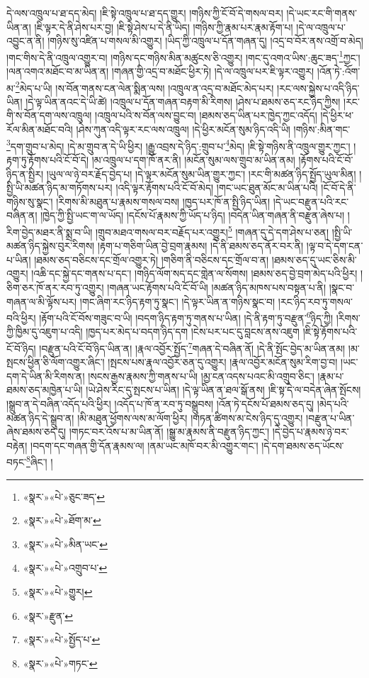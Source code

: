 དེ་ལས་འཁྲུལ་པ་ཐ་དད་མེད། །ཇི་སྟེ་འཁྲུལ་པ་ཐ་དད་གྱུར། །གཉིས་ཀྱི་ངོ་བོ་དེ་གསལ་བར། །དེ་ཡང་རང་གི་གནས་ཡིན་ན། །ཇི་ལྟར་དེ་ནི་ཤེས་པར་བྱ། །ཇི་སྟེ་ཤེས་པ་དེ་ནི་ཡིད། །གཉིས་ཀྱི་རྣམ་པར་རྣམ་རྟོག་པ། །དེ་ལ་འཁྲུལ་པ་འབྱུང་ན་ནི། །གཉིས་སུ་འཛིན་པ་གསལ་མི་འགྱུར། །ཡིད་ཀྱི་འཁྲུལ་པ་དོན་གཞན་དུ། །འདྲ་བ་བོར་ནས་འགྲོ་བ་མེད། །གང་གིས་དེ་ནི་འཁྲུལ་འགྱུར་བ། །གཉིས་དང་གཉིས་མིན་མཚུངས་ཅི་འགྱུར། །གང་དུ་འགའ་ཡིས་:ཆུང་ཟད་\footnote{«སྣར་»«པེ་»ཅུང་ཟད་}ཀྱང་། །ལན་འགའ་མཐོང་བ་མ་ཡིན་ན། །གཞན་གྱི་འདྲ་བ་མཐོང་ཕྱིར་ཏེ། །དེ་ལ་འཁྲུལ་པར་ཇི་ལྟར་འགྱུར། །འོན་ཏེ་:འོག་མ་\footnote{«སྣར་»«པེ་»ཐོག་མ་}མེད་པ་ཡི། །ས་བོན་གནས་ངན་ལེན་སྨིན་ལས། །འཁྲུལ་ན་འདྲ་བ་མཐོང་མེད་པར། །རང་ལས་སྐྱེས་པ་འདི་ཉིད་ཡིན། །དེ་ལྟ་ཡིན་ནའང་དེ་ཡི་ཚེ། །འཁྲུལ་པ་དོན་གཞན་བརྟག་མི་རིགས། །ཤེས་པ་ཐམས་ཅད་རང་ཉིད་ཀྱིས། །རང་གི་ས་བོན་དག་ལས་འཁྲུལ། །འཁྲུལ་པའི་ས་བོན་ལས་བྱུང་བ། །ཐམས་ཅད་ཡིན་པར་ཁྱེད་ཀྱང་འདོད། །དེ་ཕྱིར་ཕ་རོལ་མིན་མཐོང་བའི། །ཤེས་ཀུན་འདི་ལྟར་རང་ལས་འཁྲུལ། །དེ་ཕྱིར་མངོན་སུམ་ཉིད་འདི་ཡི། །གཉིས་:མིན་གང་\footnote{«སྣར་»«པེ་»མིན་ཡང་}དག་གྲུབ་པ་མེད། །དེ་མ་གྲུབ་ན་དེ་ཡི་ཕྱིར། །རྒྱུ་འབྲས་དེ་ཉིད་:གྲུབ་པ་\footnote{«སྣར་»«པེ་»འགྲུབ་པ་}མེད། །ཇི་སྟེ་གཉིས་ནི་འཁྲུལ་གྱུར་ཀྱང་། །རྟག་ཏུ་རྟོགས་པའི་ངོ་བོ་དེ། །མ་འཁྲུལ་པ་དག་ཁོ་ནར་ནི། །མངོན་སུམ་ལས་གྲུབ་མ་ཡིན་ནམ། །རྟོགས་པའི་ངོ་བོ་ཉིད་ན་སྤྱིར། །ཡུལ་ལ་ཉེ་བར་རྗོད་བྱེད་པ། །དེ་ལྟར་མངོན་སུམ་ཡིན་གྱུར་ཀྱང་། །རང་གི་མཚན་ཉིད་སྤྱོད་ཡུལ་མིན། །སྤྱི་ཡི་མཚན་ཉིད་མ་གཏོགས་པར། །འདི་ལྟར་རྟོགས་པའི་ངོ་བོ་མེད། །གང་ཡང་ཐུན་མོང་མ་ཡིན་པའི། །ངོ་བོ་དེ་ནི་གཉིས་སུ་སྣང་། །རིགས་མི་མཐུན་པ་རྣམས་གསལ་བས། །ཁྱད་པར་ཁོ་ན་སྤྱི་ཉིད་ཡིན། །དེ་ཡང་བརྫུན་པའི་རང་བཞིན་ན། །ཁྱེད་ཀྱི་སྤྱི་ཡང་ག་ལ་ཡོད། །དངོས་པོ་རྣམས་ཀྱི་ཡོད་པ་ཉིད། །བདེན་ཡིན་གཞན་ནི་བརྫུན་ཞེས་པ། །
རིག་བྱེད་མཐར་ནི་སྨྲ་བ་ཡི། །གྲུབ་མཐའ་གསལ་བར་བརྗོད་པར་འགྱུར།\footnote{«སྣར་»«པེ་»གྱུར།} །གཞན་དུ་དེ་དག་ཤེས་པ་ཅན། །སྤྱི་ཡི་མཚན་ཉིད་སྐྱེས་བུར་རིགས། །རྟག་པ་གཅིག་ཡིན་བྱེ་བྲག་རྣམས། །དེ་ནི་ཐམས་ཅད་ནོར་བར་ནི། །ལྟ་བ་དེ་དག་ངན་པ་ཡིན། །ཐམས་ཅད་བཅིངས་དང་གྲོལ་འགྱུར་ཏེ། །གཅིག་ནི་བཅིངས་དང་གྲོལ་བ་ན། །ཐམས་ཅད་དུ་ཡང་ཅིས་མི་འགྱུར། །འཆི་དང་སྐྱེ་དང་གནས་པ་དང་། །གཉིད་ལོག་སད་དང་གླེན་ལ་སོགས། །ཐམས་ཅད་བྱེ་བྲག་མེད་པའི་ཕྱིར། །ཅིག་ཅར་ཁོ་ནར་རབ་ཏུ་འགྱུར། །གཞན་ཡང་རྟོགས་པའི་ངོ་བོ་ཡི། །མཚན་ཉིད་མཁས་པས་བསྟན་པ་ནི། །སྣང་བ་གཞན་ལ་མི་ལྟོས་པར། །གང་ཞིག་རང་ཉིད་རྟག་ཏུ་སྣང་། །དེ་ལྟར་ཡིན་ན་གཉིས་སྣང་བ། །རང་ཉིད་རབ་ཏུ་གསལ་བའི་ཕྱིར། །རྟོག་པའི་ངོ་བོས་གཟུང་བ་ཡི། །བདག་ཉིད་རྟག་ཏུ་གནས་པ་ཡིན། །དེ་ནི་རྟག་ཏུ་བརྫུན་\footnote{«སྣར་»རྫུན་}ཉིད་ཀྱི། །རིགས་ཀྱི་ཁྱིམ་དུ་འཇུག་པ་འདི། །ཁྱད་པར་མེད་པ་བདག་ཉིད་དག །ངེས་པར་པང་དུ་བླངས་ནས་འཇུག །ཇི་སྟེ་རྟོགས་པའི་ངོ་བོ་ཉིད། །བརྫུན་པའི་ངོ་བོ་ཉིད་ཡིན་ན། །རྣལ་འབྱོར་སྤྱོད་\footnote{«སྣར་»«པེ་»སྤྱོད་པ་}གཞན་དེ་བཞིན་ནོ། །དེ་ནི་སྤོང་བྱེད་མ་ཡིན་ནམ། །མ་སྤངས་ཕྱིན་ཅི་ལོག་འགྱུར་ཞིང་། །སྤངས་པས་རྣལ་འབྱོར་ཅན་དུ་འགྱུར། །རྣལ་འབྱོར་མངོན་སུམ་རིག་བྱ་བ། །ཡང་དག་དེ་ཡིན་མི་རིགས་ན། །སངས་རྒྱས་རྣམས་ཀྱི་གནས་པ་ཡི། །མྱ་ངན་འདས་པའང་མི་འགྲུབ་ཅིང་། །རྣམ་པ་ཐམས་ཅད་མཁྱེན་པ་ཡི། །ཡེ་ཤེས་རིང་དུ་སྤངས་པ་ཡིན། །དེ་ལྟ་ཡིན་ན་ཐལ་སྒོ་ནས། །ཇི་སྟ་དེ་ལ་བདེན་ཞེན་སྤོངས། །སྒྲུབ་ན་དེ་བཞིན་འདོད་པའི་ཕྱིར། །འདོད་པ་ཁོ་ན་རབ་ཏུ་བསྒྲུབས། །འོན་ཏེ་དངོས་པོ་ཐམས་ཅད་དུ། །མེད་པའི་མཚན་ཉིད་དེ་སྒྲུབ་ན། །མི་མཐུན་ཕྱོགས་ལས་མ་ལོག་ཕྱིར། །གཏན་ཚིགས་མ་ངེས་ཉིད་དུ་འགྱུར། །བརྫུན་པ་ཡིན་ཞེས་ཐམས་ཅད་དུ། །གཏང་བར་འོས་པ་མ་ཡིན་ནོ། །སྒྱུ་མ་རྣམས་ནི་བརྫུན་ཉིད་ཀྱང་། །དེ་བྱེད་པ་རྣམས་ཉེ་བར་བརྟེན། །བདག་དང་གཞན་གྱི་དོན་རྣམས་ལ། །ནམ་ཡང་མཁོ་བར་མི་འགྱུར་གང་། །དེ་དག་ཐམས་ཅད་ཡོངས་བཏང་\footnote{«སྣར་»«པེ་»གཏང་}ཞིང་། །
